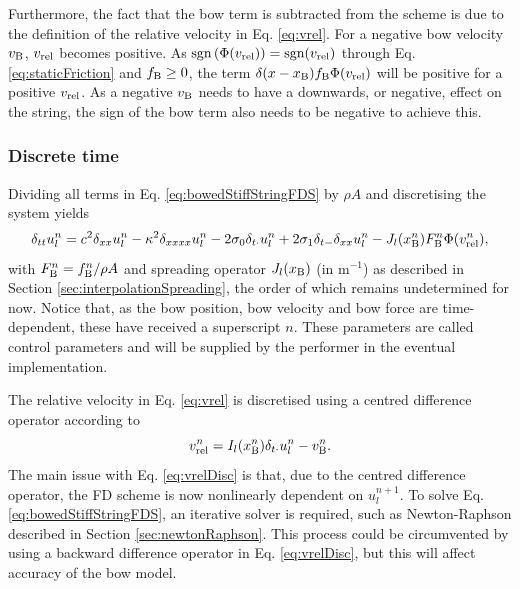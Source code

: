 Furthermore, the fact that the bow term is subtracted from the scheme is due to the definition of the relative velocity in Eq. \eqref{eq:vrel}. For a negative bow velocity $v_{\text{B}}$, $v_\text{rel}$ becomes positive. As $\text{sgn}\left(\Phi(v_\text{rel})\right) = \text{sgn}(v_\text{rel})$ through Eq. \eqref{eq:staticFriction} and $f_{\text{B}}\geq 0$, the term $\delta(x-x_{\text{B}})f_{\text{B}}\Phi(v_\text{rel})$ will be positive for a positive $v_\text{rel}$. As a negative $v_{\text{B}}$ needs to have a downwards, or negative, effect on the string, the sign of the bow term also needs to be negative to achieve this.  

\subsubsection{Discrete time}
Dividing all terms in Eq. \eqref{eq:bowedStiffStringFDS} by $\rho A$ and discretising the system yields
%
\begin{equation}\label{eq:bowedStiffStringFDS}
    \delta_{tt} u_l^n = c^2 \delta_{xx} u_l^n - \kappa^2 \delta_{xxxx} u_l^n - 2 \sigma_{0} \delta_{t\cdot} u_l^n + 2 \sigma_{1}\delta_{t-}\delta_{xx} u_l^n - J_l(x_{\text{B}}^n)F_{\text{B}}^n\Phi(v_\text{rel}^n),
\end{equation}
with $F_{\text{B}}^n = f_{\text{B}}^n/\rho A$ and spreading operator $J_l(x_{\text{B}})$ (in m$^{-1}$) as described in Section \ref{sec:interpolationSpreading}, the order of which remains undetermined for now. Notice that, as the bow position, bow velocity and bow force are time-dependent, these have received a superscript $n$. These parameters are called control parameters and will be supplied by the performer in the eventual implementation.

The relative velocity in Eq. \eqref{eq:vrel} is discretised using a centred difference operator according to
\begin{equation}\label{eq:vrelDisc}
    v_\text{rel}^n = I_l(x_{\text{B}}^n)\delta_{t\cdot} u_l^n - v_{\text{B}}^n.
\end{equation}
The main issue with Eq. \eqref{eq:vrelDisc} is that, due to the centred difference operator, the FD scheme is now nonlinearly dependent on $u_l^{n+1}$. To solve Eq. \eqref{eq:bowedStiffStringFDS}, an iterative solver is required, such as Newton-Raphson described in Section \ref{sec:newtonRaphson}. This process could be circumvented by using a backward  difference operator in Eq. \eqref{eq:vrelDisc}, but this will affect accuracy of the bow model.

